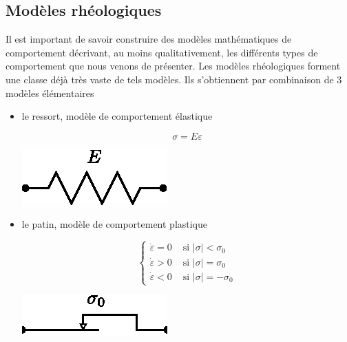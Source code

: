 \subsection{Modèles rhéologiques} \label{ssec:Ch04-2.2}
Il est important de savoir construire des modèles mathématiques de comportement décrivant, au moins qualitativement, les différents types de comportement que nous venons de présenter.
Les modèles rhéologiques forment une classe déjà très vaste de tels modèles.
Ils s'obtiennent par combinaison de 3 modèles élémentaires
\begin{itemize}
    \item le ressort, modèle de comportement élastique
        \begin{multicols}{2}
            \begin{equation}
                \sigma = E \varepsilon
                \label{eq:Ch04-039}
            \end{equation}
            \columnbreak
            \begin{center}
                \includegraphics{../images/T1_Ch04-0022}
            \end{center}
        \end{multicols}
    \item le patin, modèle de comportement plastique
        \begin{multicols}{2}
            \begin{equation}
                \begin{cases}
                    \dot\varepsilon = 0 & \text{ si } |\sigma|<\sigma_0 \\
                    \dot\varepsilon > 0 & \text{ si } |\sigma|=\sigma_0 \\
                    \dot\varepsilon < 0 & \text{ si } |\sigma|=-\sigma_0
                \end{cases}
                \label{eq:Ch04-040}
            \end{equation}
            \columnbreak
            \begin{center}
                \includegraphics{../images/T1_Ch04-0023}

\end{center}
\end{multicols}
\end{itemize}
